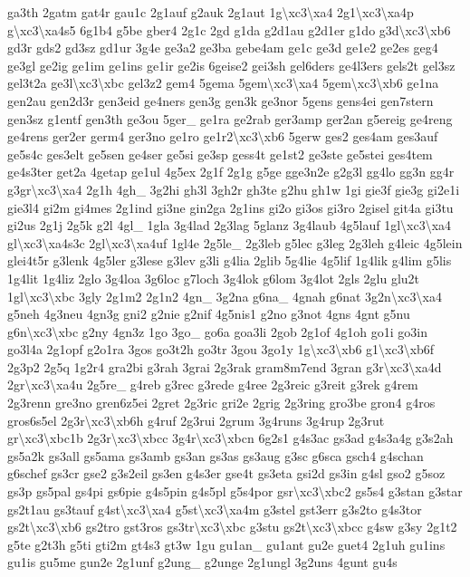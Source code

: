 {ga3th 2gatm gat4r gau1c 2g1auf g2auk 2g1aut 1g\textbackslash{}xc3\textbackslash{}xa4 2g1\textbackslash{}xc3\textbackslash{}xa4p g\textbackslash{}xc3\textbackslash{}xa4s5 6g1b4 g5be gber4 2g1c 2gd g1da g2d1au g2d1er g1do g3d\textbackslash{}xc3\textbackslash{}xb6 gd3r gds2 gd3sz gd1ur 3g4e ge3a2 ge3ba gebe4am ge1c ge3d ge1e2 ge2es geg4 ge3gl ge2ig ge1im ge1ins ge1ir ge2is 6geise2 gei3sh gel6ders ge4l3ers gels2t gel3sz gel3t2a ge3l\textbackslash{}xc3\textbackslash{}xbc gel3z2 gem4 5gema 5gem\textbackslash{}xc3\textbackslash{}xa4 5gem\textbackslash{}xc3\textbackslash{}xb6 ge1na gen2au gen2d3r gen3eid ge4ners gen3g gen3k ge3nor 5gens gens4ei gen7stern gen3sz g1entf gen3th ge3ou 5ger\-\_\- ge1ra ge2rab ger3amp ger2an g5ereig ge4reng ge4rens ger2er germ4 ger3no ge1ro ge1r2\textbackslash{}xc3\textbackslash{}xb6 5gerw ges2 ges4am ges3auf ge5s4c ges3elt ge5sen ge4ser ge5si ge3sp gess4t ge1st2 ge3ste ge5stei ges4tem ge4s3ter get2a 4getap ge1ul 4g5ex 2g1f 2g1g g5ge gge3n2e g2g3l gg4lo gg3n gg4r g3gr\textbackslash{}xc3\textbackslash{}xa4 2g1h 4gh\-\_\- 3g2hi gh3l 3gh2r gh3te g2hu gh1w 1gi gie3f gie3g gi2e1i gie3l4 gi2m gi4mes 2g1ind gi3ne gin2ga 2g1ins gi2o gi3os gi3ro 2gisel git4a gi3tu gi2us 2g1j 2g5k g2l 4gl\-\_\- 1gla 3g4lad 2g3lag 5glanz 3g4laub 4g5lauf 1gl\textbackslash{}xc3\textbackslash{}xa4 gl\textbackslash{}xc3\textbackslash{}xa4s3c 2gl\textbackslash{}xc3\textbackslash{}xa4uf 1gl4e 2g5le\-\_\- 2g3leb g5lec g3leg 2g3leh g4leic 4g5lein glei4t5r g3lenk 4g5ler g3lese g3lev g3li g4lia 2glib 5g4lie 4g5lif 1g4lik g4lim g5lis 1g4lit 1g4liz 2glo 3g4loa 3g6loc g7loch 3g4lok g6lom 3g4lot 2gls 2glu glu2t 1gl\textbackslash{}xc3\textbackslash{}xbc 3gly 2g1m2 2g1n2 4gn\-\_\- 3g2na g6na\-\_\- 4gnah g6nat 3g2n\textbackslash{}xc3\textbackslash{}xa4 g5neh 4g3neu 4gn3g gni2 g2nie g2nif 4g5nis1 g2no g3not 4gns 4gnt g5nu g6n\textbackslash{}xc3\textbackslash{}xbc g2ny 4gn3z 1go 3go\-\_\- go6a goa3li 2gob 2g1of 4g1oh go1i go3in go3l4a 2g1opf g2o1ra 3gos go3t2h go3tr 3gou 3go1y 1g\textbackslash{}xc3\textbackslash{}xb6 g1\textbackslash{}xc3\textbackslash{}xb6f 2g3p2 2g5q 1g2r4 gra2bi g3rah 3grai 2g3rak gram8m7end 3gran g3r\textbackslash{}xc3\textbackslash{}xa4d 2gr\textbackslash{}xc3\textbackslash{}xa4u 2g5re\-\_\- g4reb g3rec g3rede g4ree 2g3reic g3reit g3rek g4rem 2g3renn gre3no gren6z5ei 2gret 2g3ric gri2e 2grig 2g3ring gro3be gron4 g4ros gros6s5el 2g3r\textbackslash{}xc3\textbackslash{}xb6h g4ruf 2g3rui 2grum 3g4runs 3g4rup 2g3rut gr\textbackslash{}xc3\textbackslash{}xbc1b 2g3r\textbackslash{}xc3\textbackslash{}xbcc 3g4r\textbackslash{}xc3\textbackslash{}xbcn 6g2s1 g4s3ac gs3ad g4s3a4g g3s2ah gs5a2k gs3all gs5ama gs3amb gs3an gs3as gs3aug g3sc g6sca gsch4 g4schan g6schef gs3cr gse2 g3s2eil gs3en g4s3er gse4t gs3eta gsi2d gs3in g4sl gso2 g5soz gs3p gs5pal gs4pi gs6pie g4s5pin g4s5pl g5s4por gsr\textbackslash{}xc3\textbackslash{}xbc2 gs5s4 g3stan g3star gs2t1au gs3tauf g4st\textbackslash{}xc3\textbackslash{}xa4 g5st\textbackslash{}xc3\textbackslash{}xa4m g3stel gst3err g3s2to g4s3tor gs2t\textbackslash{}xc3\textbackslash{}xb6 gs2tro gst3ros gs3tr\textbackslash{}xc3\textbackslash{}xbc g3stu gs2t\textbackslash{}xc3\textbackslash{}xbcc g4sw g3sy 2g1t2 g5te g2t3h g5ti gti2m gt4s3 gt3w 1gu gu1an\-\_\- gu1ant gu2e guet4 2g1uh gu1ins gu1is gu5me gun2e 2g1unf g2ung\-\_\- g2unge 2g1ungl 3g2uns 4gunt gu4s }
